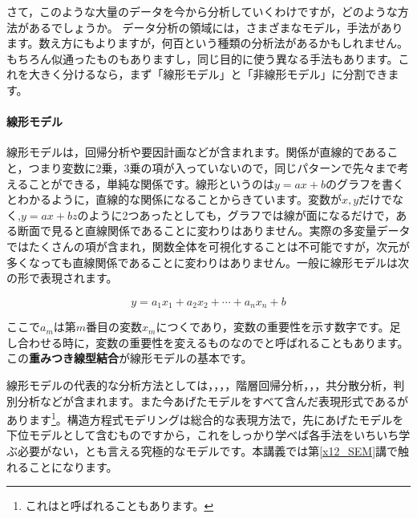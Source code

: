 \documentclass{ltjsbook}
\begin{document}
さて，このような大量のデータを今から分析していくわけですが，どのような方法があるでしょうか。
データ分析の領域には，さまざまなモデル，手法があります。数え方にもよりますが，何百という種類の分析法があるかもしれません。もちろん似通ったものもありますし，同じ目的に使う異なる手法もあります。これを大きく分けるなら，まず「線形モデル」と「非線形モデル」に分割できます。

\paragraph{線形モデル}線形モデルは，回帰分析や要因計画などが含まれます。関係が直線的であること，つまり変数に2乗，3乗の項が入っていないので，同じパターンで先々まで考えることができる，単純な関係です。線形というのは$y=ax+b$のグラフを書くとわかるように，直線的な関係になることからきています。変数が$x,y$だけでなく,$y = ax + bz$のように2つあったとしても，グラフでは線が面になるだけで，ある断面で見ると直線関係であることに変わりはありません。実際の多変量データではたくさんの項が含まれ，関数全体を可視化することは不可能ですが，次元が多くなっても直線関係であることに変わりはありません。一般に線形モデルは次の形で表現されます。

\[ y = a_1 x_1 + a_2 x_2 + \cdots + a_n x_n + b\]

ここで$a_m$は第$m$番目の変数$x_m$につくであり，変数の重要性を示す数字です。足し合わせる時に，変数の重要性を変えるものなのでと呼ばれることもあります。この\textbf{重みつき線型結合}が線形モデルの基本です。

線形モデルの代表的な分析方法としては，，，，階層回帰分析，，，共分散分析，判別分析などが含まれます。また今あげたモデルをすべて含んだ表現形式であるがあります\footnote{これはと呼ばれることもあります。}。構造方程式モデリングは総合的な表現方法で，先にあげたモデルを下位モデルとして含むものですから，これをしっかり学べば各手法をいちいち学ぶ必要がない，とも言える究極的なモデルです。本講義では第\ref{x12_SEM}講で触れることになります。
\end{document}
